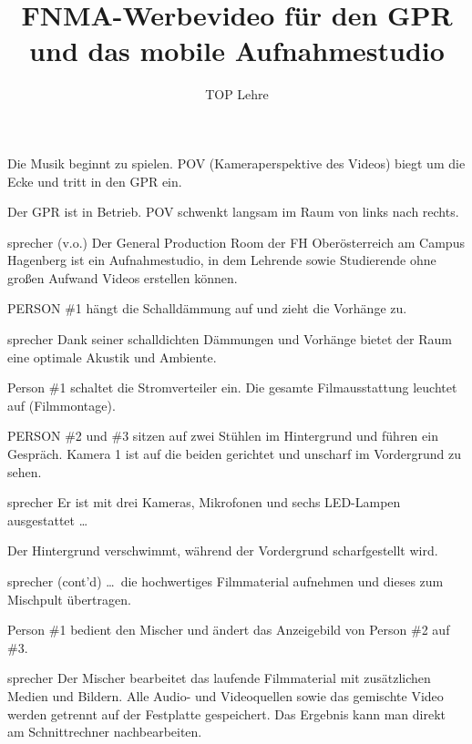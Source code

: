 \documentclass{screenplay}
\title{
	FNMA-Werbevideo für den GPR\\
	und das mobile Aufnahmestudio
}
\author{TOP Lehre}
\begin{document}
	\coverpage
	\fadein
	
	
	Die Musik beginnt zu spielen. POV (Kameraperspektive des Videos) biegt um die Ecke und tritt in den GPR ein.
	
	
	Der GPR ist in Betrieb. POV schwenkt langsam im Raum von links nach rechts.
	
	\begin{dialogue}[nüchtern]{sprecher (v.o.)}
		Der General Production Room der FH Oberösterreich am Campus Hagenberg ist ein Aufnahmestudio, in dem Lehrende sowie Studierende ohne großen Aufwand Videos erstellen können.
	\end{dialogue}
	
	PERSON \#1 hängt die Schalldämmung auf und zieht die Vorhänge zu.
	
	\begin{dialogue}{sprecher}
		Dank seiner schalldichten Dämmungen und Vorhänge bietet der Raum eine optimale Akustik und Ambiente.
	\end{dialogue}
	
	Person \#1 schaltet die Stromverteiler ein. Die gesamte Filmausstattung leuchtet auf (Filmmontage).
	
	PERSON \#2 und \#3 sitzen auf zwei Stühlen im Hintergrund und führen ein Gespräch. Kamera 1 ist auf die beiden gerichtet und unscharf im Vordergrund zu sehen.
	
	\begin{dialogue}{sprecher}
		Er ist mit drei Kameras, Mikrofonen und sechs LED-Lampen ausgestattet \dots
	\end{dialogue}
	
	Der Hintergrund verschwimmt, während der Vordergrund scharfgestellt wird.
	
	\begin{dialogue}{sprecher (cont'd)}
		\dots~die hochwertiges Filmmaterial aufnehmen und dieses zum Mischpult übertragen.
	\end{dialogue}
	
	Person \#1 bedient den Mischer und ändert das Anzeigebild von Person \#2 auf \#3.
	
	\begin{dialogue}{sprecher}
		Der Mischer bearbeitet das laufende Filmmaterial mit zusätzlichen Medien und Bildern. Alle Audio- und Videoquellen sowie das gemischte Video werden getrennt auf der Festplatte gespeichert. Das Ergebnis kann man direkt am Schnittrechner nachbearbeiten.
	\end{dialogue}
	
\end{document}
